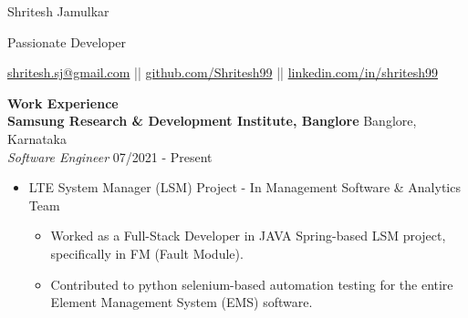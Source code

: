\documentclass{article}
\begin{document}
\begin{center}

\LARGE Shritesh Jamulkar \\

\vspace{3pt}

\large \textcolor{NavyBlue}{Passionate Developer} \\

\vspace{5pt}

\normalsize \href{mailto:shritesh.sj@gmail@gmail.com}{shritesh.sj@gmail.com} || \href{https://github.com/Shritesh99}{github.com/Shritesh99} || \href{https://linkedin.com/in/shritesh99}{linkedin.com/in/shritesh99} \\
\end{center}

\noindent \large \textbf{\textcolor{NavyBlue}{Work Experience}} \vspace{5pt} \\
\noindent \normalsize \textbf{Samsung Research \& Development Institute, Banglore} \hfill Banglore, Karnataka \\
\textit{Software Engineer} \hfill 07/2021 - Present
\begin{itemize}[noitemsep,nolistsep,leftmargin=*]
    \item {\normalsize {LTE System Manager (LSM) Project - In Management Software \& Analytics Team }
        \begin{itemize}
            \item  Worked as a Full-Stack Developer in JAVA Spring-based LSM project, specifically in FM (Fault Module).
            \item Contributed to python selenium-based automation testing for the entire Element Management System (EMS) software.
        \end{itemize}
    }
\end{itemize}

\vspace{5pt}
\end{document}
